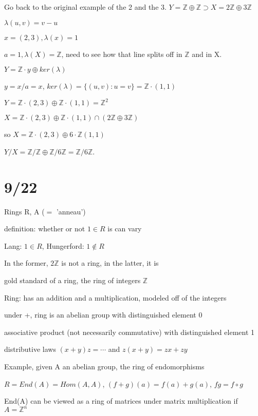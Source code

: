 \documentclass[12pt]{article}
\begin{document}
\noindent
Go back to the original example of the 2 and the 3.  $Y = \mathds{Z} \oplus \mathds{Z} \supset X = 2\mathds{Z} \oplus 3\mathds{Z}$

$\lambda(u, v) = v - u$

$x = (2, 3), \lambda(x) = 1$

$a = 1, \lambda(X) = \mathds{Z}$, need to see how that line splits off in $\mathds{Z}$ and in X.

$Y = \mathds{Z}\cdot y \oplus ker(\lambda)$

$y = x/a = x$, $ker(\lambda) = \{(u, v) : u = v\} = \mathds{Z} \cdot (1, 1)$

$Y = \mathds{Z} \cdot (2, 3) \oplus \mathds{Z} \cdot (1, 1) = \mathds{Z}^2$

$X = \mathds{Z} \cdot (2, 3) \oplus \mathds{Z} \cdot (1, 1) \cap (2\mathds{Z} \oplus 3\mathds{Z})$

so $X = \mathds{Z} \cdot (2, 3) \oplus 6 \cdot \mathds{Z}(1, 1)$

$Y/X = \mathds{Z}/\mathds{Z} \oplus \mathds{Z}/6\mathds{Z} = \mathds{Z}/6\mathds{Z}$.

\section{9/22}

Rings R, A ($=$ 'anneau')

definition: whether or not $1 \in R$ is can vary

Lang: $1 \in R$, Hungerford: $1 \not \in R$

In the former, $2\mathds{Z}$ is not a ring, in the latter, it is

gold standard of a ring, the ring of integers $\mathds{Z}$

\noindent
Ring: has an addition and a multiplication, modeled off of the integers

under +, ring is an abelian group with distinguished element 0

associative product (not necessarily commutative) with distinguished element 1

distributive laws $(x + y)z = \cdots$ and $z(x + y) = zx + zy$

\noindent
Example, given A an abelian group, the ring of endomorphisms

$R = End(A) = Hom(A, A)$, $(f + g)(a) = f(a) + g(a)$, $fg = f \circ g$

End(A) can be viewed as a ring of matrices under matrix multiplication if $A = \mathds{Z}^n$
\end{document}
